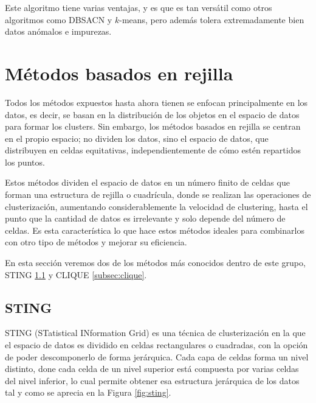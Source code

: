 \documentclass[10pt, a4paper]{article}
\begin{document}
Este algoritmo tiene varias ventajas, y es que es tan versátil como otros algoritmos como DBSACN y $k$-means, pero además tolera extremadamente bien datos anómalos e impurezas.




\section{Métodos basados en rejilla} \label{sec:Métodos basados en rejilla}

\cite{LIBRO} Todos los métodos expuestos hasta ahora tienen se enfocan principalmente en los datos, es decir, se basan en la distribución de los objetos en el espacio de datos para formar los clusters. Sin embargo, los métodos basados en rejilla se centran en el propio espacio; no dividen los datos, sino el espacio de datos, que distribuyen en celdas equitativas, independientemente de cómo estén repartidos los puntos.

Estos métodos dividen el espacio de datos en un número finito de celdas que forman una estructura de rejilla o cuadrícula, donde se realizan las operaciones de clusterización, aumentando considerablemente la velocidad de clustering, hasta el punto que la cantidad de datos es irrelevante y solo depende del número de celdas. Es esta característica lo que hace estos métodos ideales para combinarlos con otro tipo de métodos y mejorar su eficiencia.

En esta sección veremos dos de los métodos más conocidos dentro de este grupo, STING \ref{subsec:sting} y CLIQUE \ref{subsec:clique}.




\subsection{\textbf{STING}} \label{subsec:sting}

\cite{sting} STING (STatistical INformation Grid) es una técnica de clusterización en la que el espacio de datos es dividido en celdas rectangulares o cuadradas, con la opción de poder descomponerlo de forma jerárquica. Cada capa de celdas forma un nivel distinto, done cada celda de un nivel superior está compuesta por varias celdas del nivel inferior, lo cual permite obtener esa estructura jerárquica de los datos tal y como se aprecia en la Figura \ref{fig:sting}.
\end{document}
